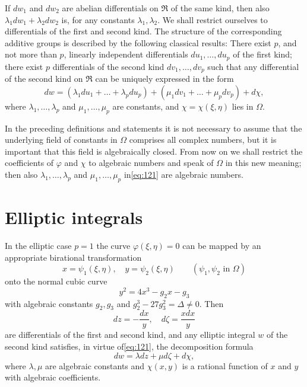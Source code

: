If $dw_1$ and $dw_2$ are abelian differentials on $\mathfrak{R}$ of the same kind, then also $\lambda_1 dw_1 + \lambda_2 dw_2$ is, for any constants $\lambda_1, \lambda_2$. We shall restrict ourselves to differentials of the first and second kind. The structure of the corresponding additive groups is described by the following classical results: There exist $p$, and not more than $p$, linearly independent differentials $du_1, \dots, du_p$ of the first kind; there exist $p$ differentials of the second kind $dv_1, \dots, dv_p$ such that any differential of the second kind on $\mathfrak{R}$ can be uniquely expressed in the form
\begin{equation}
dw = (\lambda_1 du_1 + \dots + \lambda_p du_p) + (\mu_1 dv_1 + \dots + \mu_p dv_p) + d\chi, \tag{121}\label{eq:121}
\end{equation}
where $\lambda_1, \dots, \lambda_p$ and $\mu_1, \dots, \mu_p$ are constants, and $\chi = \chi(\xi, \eta)$ lies in $\Omega$.

In the preceding definitions and statements it is not necessary to assume that the underlying field of constants in $\Omega$ comprises all complex numbers, but it is important that this field is algebraically closed. From now on we shall restrict the coefficients of $\varphi$ and $\chi$ to algebraic numbers and speak of $\Omega$ in this new meaning; then also $\lambda_1, \dots, \lambda_p$ and $\mu_1, \dots, \mu_p$ in\eqref{eq:121} are algebraic numbers.

\section{Elliptic integrals}\label{sec:4.2}

In the elliptic case $p=1$ the curve $\varphi(\xi, \eta) = 0$ can be mapped by an appropriate birational transformation
\[
x = \psi_1(\xi, \eta), \quad y = \psi_2(\xi, \eta) \qquad (\psi_1, \psi_2 \text{ in } \Omega)
\]
onto the normal cubic curve
\[
y^2 = 4x^3 - g_2 x - g_3
\]
with algebraic constants $g_2, g_3$ and $g_2^3 - 27g_3^2 = \Delta \neq 0$. Then
\[
dz = -\frac{dx}{y}, \quad d\zeta = \frac{x dx}{y}
\]
are differentials of the first and second kind, and any elliptic integral $w$ of the second kind satisfies, in virtue of\eqref{eq:121}, the decomposition formula
\begin{equation}
dw = \lambda dz + \mu d\zeta + d\chi, \tag{122}\label{eq:122}
\end{equation}
where $\lambda, \mu$ are algebraic constants and $\chi(x, y)$ is a rational function of $x$ and $y$ with algebraic coefficients.

